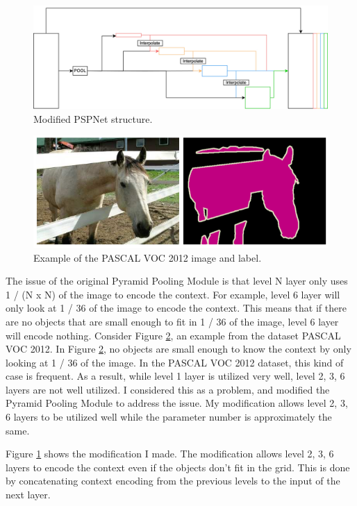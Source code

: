 \documentclass[10pt,twocolumn,letterpaper]{article}
\begin{document}
\begin{figure}[t]
  \centering
  \includegraphics[width=\linewidth]{figures/PSPNet_modified.jpg}
  \caption{Modified PSPNet structure.}
  \label{fig:PSPNet_modified}
\end{figure}
\begin{figure}[t]
  \centering
  \includegraphics[width=\linewidth]{figures/PASCAL_VOC_horse.png}
  \caption{Example of the PASCAL VOC 2012 image and label.}
  \label{fig:PASCAL_VOC_horse}
\end{figure}
The issue of the original Pyramid Pooling Module is that level N layer only uses 1 / (N x N) of the image to encode the context. For example, level 6 layer will only look at 1 / 36 of the image to encode the context. This means that if there are no objects that are small enough to fit in 1 / 36 of the image, level 6 layer will encode nothing. Consider Figure \ref{fig:PASCAL_VOC_horse}, an example from the dataset PASCAL VOC 2012. In Figure \ref{fig:PASCAL_VOC_horse}, no objects are small enough to know the context by only looking at 1 / 36 of the image. In the PASCAL VOC 2012 dataset, this kind of case is frequent. As a result, while level 1 layer is utilized very well, level 2, 3, 6 layers are not well utilized. I considered this as a problem, and modified the Pyramid Pooling Module to address the issue. My modification allows level 2, 3, 6 layers to be utilized well while the parameter number is approximately the same.

Figure \ref{fig:PSPNet_modified} shows the modification I made. The modification allows level 2, 3, 6 layers to encode the context even if the objects don't fit in the grid. This is done by concatenating context encoding from the previous levels to the input of the next layer.
\end{document}
